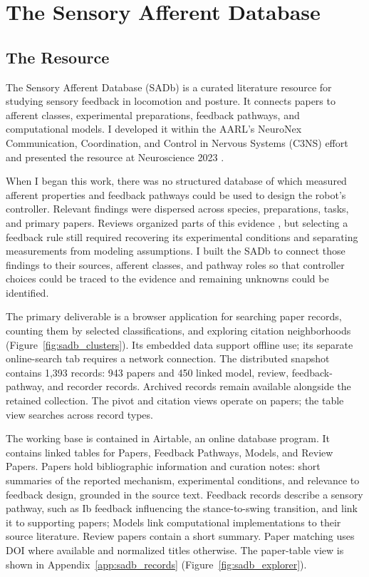 \chapter{The Sensory Afferent Database}\label{ch:database}
\graphicspath{{figs/50-database/}}

\section{The Resource}\label{sec:sadb_resource}

The Sensory Afferent Database (SADb) is a curated literature resource for studying sensory feedback in locomotion and posture. It connects papers to afferent classes, experimental preparations, feedback pathways, and computational models. I developed it within the AARL's NeuroNex Communication, Coordination, and Control in Nervous Systems (C3NS) effort and presented the resource at Neuroscience 2023 \citep{bolen_sensory_2023}.

When I began this work, there was no structured database of which measured afferent properties and feedback pathways could be used to design the robot's controller. Relevant findings were dispersed across species, preparations, tasks, and primary papers. Reviews organized parts of this evidence \citep{van_de_crommert_review_1998, windhorst_muscle_2007, windhorst_spinal_2022}, but selecting a feedback rule still required recovering its experimental conditions and separating measurements from modeling assumptions. I built the SADb to connect those findings to their sources, afferent classes, and pathway roles so that controller choices could be traced to the evidence and remaining unknowns could be identified.

The primary deliverable is a browser application for searching paper records, counting them by selected classifications, and exploring citation neighborhoods (Figure~\ref{fig:sadb_clusters}). Its embedded data support offline use; its separate online-search tab requires a network connection. The distributed snapshot contains 1,393 records: 943 papers and 450 linked model, review, feedback-pathway, and recorder records. Archived records remain available alongside the retained collection. The pivot and citation views operate on papers; the table view searches across record types.

The working base is contained in Airtable, an online database program. It contains linked tables for Papers, Feedback Pathways, Models, and Review Papers. Papers hold bibliographic information and curation notes: short summaries of the reported mechanism, experimental conditions, and relevance to feedback design, grounded in the source text. Feedback records describe a sensory pathway, such as Ib feedback influencing the stance-to-swing transition, and link it to supporting papers; Models link computational implementations to their source literature. Review papers contain a short summary. Paper matching uses DOI where available and normalized titles otherwise. The paper-table view is shown in Appendix~\ref{app:sadb_records} (Figure~\ref{fig:sadb_explorer}).


